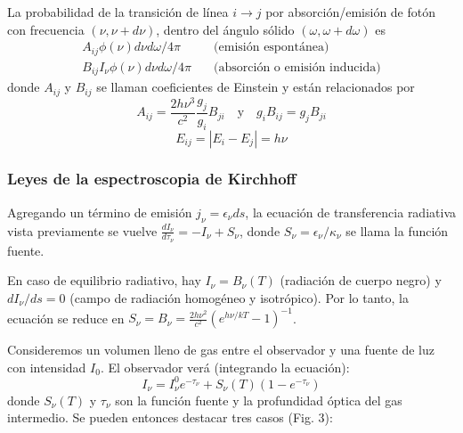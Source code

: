 \documentclass[11pt,letterpaper]{article}
\begin{document}
La probabilidad de la transición de línea \(i \to j\) por absorción/emisión de fotón con frecuencia \((\nu, \nu+d\nu)\), dentro del ángulo sólido \((\omega, \omega+d\omega)\) es
\begin{align}
    A_{ij} \phi(\nu) d\nu d\omega/4\pi & \quad \text{(emisión espontánea)} \\
    B_{ij} I_\nu \phi(\nu) d\nu d\omega/4\pi & \quad \text{(absorción o emisión inducida)}
\end{align}
donde \(A_{ij}\) y \(B_{ij}\) se llaman coeficientes de Einstein y están relacionados por
\begin{equation}
    A_{ij} = \frac{2h\nu^3}{c^2} \frac{g_j}{g_i} B_{ji} \quad \text{y} \quad g_i B_{ij} = g_j B_{ji}
\end{equation}
\begin{equation}
    E_{ij} = |E_i - E_j| = h\nu
\end{equation}

\subsubsection{Leyes de la espectroscopia de Kirchhoff}

Agregando un término de emisión \(j_\nu = \epsilon_\nu ds\), la ecuación de transferencia radiativa vista previamente se vuelve \(\frac{dI_\nu}{d\tau_\nu} = -I_\nu + S_\nu\), donde \(S_\nu = \epsilon_\nu/\kappa_\nu\) se llama la función fuente.

En caso de equilibrio radiativo, hay \(I_\nu = B_\nu(T)\) (radiación de cuerpo negro) y \(dI_\nu/ds = 0\) (campo de radiación homogéneo y isotrópico). Por lo tanto, la ecuación se reduce en \(S_\nu = B_\nu = \frac{2h\nu^2}{c^2} (e^{h\nu/kT}-1)^{-1}\).

Consideremos un volumen lleno de gas entre el observador y una fuente de luz con intensidad \(I_0\). El observador verá (integrando la ecuación):
\begin{equation}
    I_\nu = I_\nu^0 e^{-\tau_\nu} + S_\nu(T)(1 - e^{-\tau_\nu})
\end{equation}
donde \(S_\nu(T)\) y \(\tau_\nu\) son la función fuente y la profundidad óptica del gas intermedio. Se pueden entonces destacar tres casos (Fig. 3):
\end{document}
